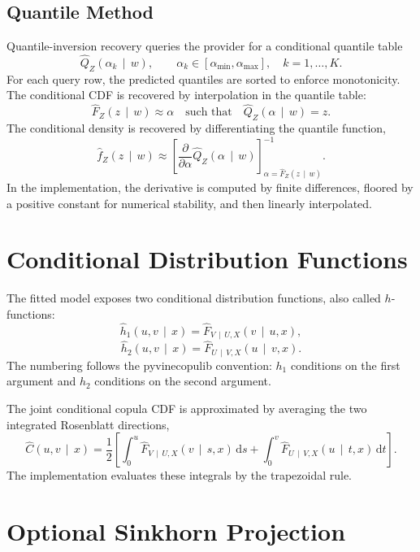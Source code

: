 \documentclass[11pt]{article}
\newcommand{\dd}{\,\mathrm{d}}
\newcommand{\given}{\,\mid\,}
\begin{document}
\subsection{Quantile Method}

Quantile-inversion recovery queries the provider for a conditional quantile table
\[
  \widehat Q_Z(\alpha_k \given w),
  \qquad
  \alpha_k \in [\alpha_{\min},\alpha_{\max}],
  \quad k=1,\dots,K.
\]
For each query row, the predicted quantiles are sorted to enforce
monotonicity. The conditional CDF is recovered by interpolation in the
quantile table:
\[
  \widehat F_Z(z \given w)
  \approx
  \alpha
  \quad\text{such that}\quad
  \widehat Q_Z(\alpha \given w) = z.
\]
The conditional density is recovered by differentiating the quantile
function,
\[
  \widehat f_Z(z \given w)
  \approx
  \left[
    \frac{\partial}{\partial \alpha}
    \widehat Q_Z(\alpha \given w)
  \right]^{-1}_{\alpha=\widehat F_Z(z \given w)}.
  \label{eq:quantile-density}
\]
In the implementation, the derivative is computed by finite differences,
floored by a positive constant for numerical stability, and then linearly
interpolated.

\section{Conditional Distribution Functions}

The fitted model exposes two conditional distribution functions, also
called $h$-functions:
\[
  \widehat h_1(u,v \given x)
  =
  \widehat F_{V \given U,X}(v \given u,x),
  \label{eq:hfunc1}
\]
\[
  \widehat h_2(u,v \given x)
  =
  \widehat F_{U \given V,X}(u \given v,x).
  \label{eq:hfunc2}
\]
The numbering follows the pyvinecopulib convention: $h_1$ conditions on
the first argument and $h_2$ conditions on the second argument.

The joint conditional copula CDF is approximated by averaging the two
integrated Rosenblatt directions,
\[
  \widehat C(u,v \given x)
  =
  \frac{1}{2}
  \left[
    \int_0^u
    \widehat F_{V \given U,X}(v \given s,x)\dd s
    +
    \int_0^v
    \widehat F_{U \given V,X}(u \given t,x)\dd t
  \right].
  \label{eq:joint-cdf}
\]
The implementation evaluates these integrals by the trapezoidal rule.

\section{Optional Sinkhorn Projection}
\label{sec:sinkhorn}
\end{document}
